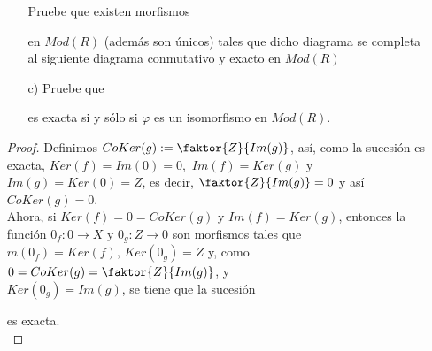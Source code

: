 \documentclass{article}
\begin{document}
\begin{enumerate}[label=\textbf{Ej \arabic*.}]
\begin{itemize}
			\begin{center}
			\end{center}
			Pruebe que existen morfismos
			en $Mod(R)$ (además son únicos) tales que dicho diagrama se completa al siguiente diagrama conmutativo y exacto en $Mod(R)$
			\begin{center}
			\end{center}
			
			\item[c)] Pruebe que 
			es exacta si y sólo si $\varphi$ es un isomorfismo en $Mod(R)$.
		\end{itemize}
		\begin{proof} 
			 Definimos $CoKer(g):=\faktor{Z}{Im(g)}$, así, como la sucesión es exacta, $Ker(f)=Im(0)=0,\,\,Im(f)=Ker(g)$ y \\
			$Im(g)=Ker(0)=Z$, es decir, $\faktor{Z}{Im(g)}=0$ y así $CoKer(g)=0$.\\
			
			Ahora, si $Ker(f)=0=CoKer(g)$ y $Im(f)=Ker(g)$, entonces la función $0_f\colon 0\longrightarrow X$ y $0_g\colon Z\longrightarrow 0$ son
			morfismos tales que\\ $m(0_f)=Ker(f),\, Ker(0_g)=Z$ y, como $0=CoKer(g)=\faktor{Z}{Im(g)}$, y\\$Ker(0_g)=Im(g)$, se tiene que la sucesión 
			es exacta.\\
			

\end{proof}
\end{enumerate}
\end{document}
